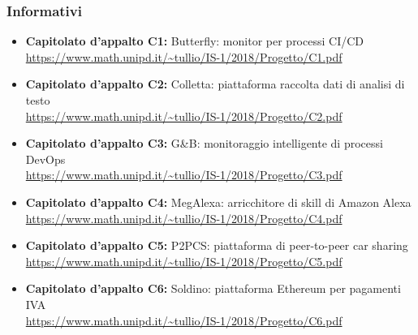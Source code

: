 \subsubsection{Informativi}
\begin{itemize}
\item \textbf{Capitolato d’appalto C1:} Butterfly: monitor per processi CI/CD\\
\url{https://www.math.unipd.it/~tullio/IS-1/2018/Progetto/C1.pdf}
\item \textbf{Capitolato d’appalto C2:} Colletta: piattaforma raccolta dati di analisi di testo\\
\url{https://www.math.unipd.it/~tullio/IS-1/2018/Progetto/C2.pdf}
\item \textbf{Capitolato d’appalto C3:} G\&B: monitoraggio intelligente di processi DevOps\\
\url{https://www.math.unipd.it/~tullio/IS-1/2018/Progetto/C3.pdf}
\item \textbf{Capitolato d’appalto C4:} MegAlexa: arricchitore di skill di Amazon Alexa\\
\url{https://www.math.unipd.it/~tullio/IS-1/2018/Progetto/C4.pdf}
\item \textbf{Capitolato d’appalto C5:} P2PCS: piattaforma di peer-to-peer car sharing	\\
\url{https://www.math.unipd.it/~tullio/IS-1/2018/Progetto/C5.pdf}
\item \textbf{Capitolato d’appalto C6:} Soldino: piattaforma Ethereum per pagamenti IVA\\
\url{https://www.math.unipd.it/~tullio/IS-1/2018/Progetto/C6.pdf}
\end{itemize}
